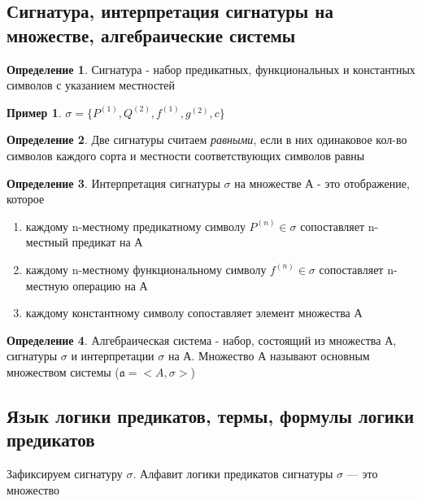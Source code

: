\documentclass[a4paper]{article}
\theoremstyle{definition}
\newtheorem*{example}{Пример}
\newtheorem*{definition}{Определение}
\theoremstyle{remark}
\begin{document}
    \subsection{Сигнатура, интерпретация сигнатуры на множестве, алгебраические системы}
    \begin{definition}
        Сигнатура - набор предикатных, функциональных и константных символов с указанием местностей
    \end{definition}
    \begin{example}
    $\sigma = \{P^{(1)}, Q^{(2)}, f^{(1)}, g^{(2)}, c\}$
    \end{example}
    \begin{definition}
        Две сигнатуры считаем \textit{равными}, если в них одинаковое кол-во символов каждого
        сорта и местности соответствующих символов равны
    \end{definition}
    \begin{definition}
        Интерпретация сигнатуры $\sigma$ на множестве А - это отображение, которое
        \begin{enumerate}
            \item каждому n-местному предикатному символу $P^{(n)}\in \sigma$ сопоставляет n-местный предикат 
            на А
            \item каждому n-местному функциональному символу  $f^{(n)}\in \sigma$ сопоставляет n-местную операцию на А
            \item каждому константному символу сопоставляет элемент множества А
        \end{enumerate}
    \end{definition}
    \begin{definition}
        Алгебраическая система - набор, состоящий из множества А, сигнатуры $\sigma$ и интерпретации $\sigma$ на А. 
        Множество А называют основным множеством системы ($\mathfrak{a} = <A, \sigma>$)
    \end{definition}
    \subsection{Язык логики предикатов, термы, формулы логики предикатов}
    Зафиксируем сигнатуру $\sigma$. Алфавит логики предикатов сигнатуры $\sigma$ — это множество
\end{document}
